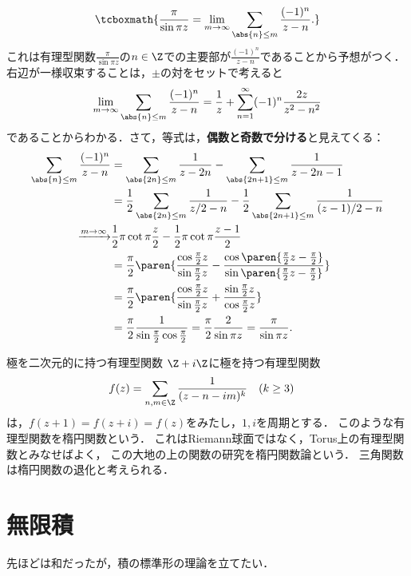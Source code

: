\documentclass[uplatex, dvipdfmx]{jsreport}
\begin{document}
\begin{example}\mbox{}
        \[\tcboxmath{\frac{\pi}{\sin\pi z}=\lim_{m\to\infty}\sum_{\abs{n}\le m}\frac{(-1)^n}{z-n}.}\]
        これは有理型関数$\frac{\pi}{\sin\pi z}$の$n\in\Z$での主要部が$\frac{(-1)^n}{z-n}$であることから予想がつく．
    右辺が一様収束することは，$\pm$の対をセットで考えると
    \[\lim_{m\to\infty}\sum_{\abs{n}\le m}\frac{(-1)^n}{z-n}=\frac{1}{z}+\sum^\infty_{n=1}(-1)^n\frac{2z}{z^2-n^2}\]
    であることからわかる．さて，等式は，\textbf{偶数と奇数で分ける}と見えてくる：
    \begin{align*}
        \sum_{\abs{n}\le m}\frac{(-1)^n}{z-n}&=\sum_{\abs{2n}\le m}\frac{1}{z-2n}-\sum_{\abs{2n+1}\le m}\frac{1}{z-2n-1}\\
        &=\frac{1}{2}\sum_{\abs{2n}\le m}\frac{1}{z/2-n}-\frac{1}{2}\sum_{\abs{2n+1}\le m}\frac{1}{(z-1)/2-n}\\
        \xrightarrow{m\to\infty}&\frac{1}{2}\pi\cot\pi\frac{z}{2}-\frac{1}{2}\pi\cot\pi\frac{z-1}{2}\\
        &=\frac{\pi}{2}\paren{\frac{\cos\frac{\pi}{2}z}{\sin\frac{\pi}{2}z}-\frac{\cos\paren{\frac{\pi}{2}z-\frac{\pi}{2}}}{\sin\paren{\frac{\pi}{2}z-\frac{\pi}{2}}}}\\
        &=\frac{\pi}{2}\paren{\frac{\cos\frac{\pi}{2}z}{\sin\frac{\pi}{2}z}+\frac{\sin\frac{\pi}{2}z}{\cos\frac{\pi}{2}z}}\\
        &=\frac{\pi}{2}\frac{1}{\sin\frac{\pi}{2}\cos\frac{\pi}{2}}=\frac{\pi}{2}\frac{2}{\sin\pi z}=\frac{\pi}{\sin\pi z}.
    \end{align*}
\end{example}

\begin{itembox}[l]{極を二次元的に持つ有理型関数}
    $\Z+i\Z$に極を持つ有理型関数
    \begin{align*}
        f(z)&=\sum_{n,m\in\Z}\frac{1}{(z-n-im)^k}\quad(k\ge 3)
    \end{align*}
    は，$f(z+1)=f(z+i)=f(z)$をみたし，$1,i$を周期とする．
    このような有理型関数を楕円関数という．
    これはRiemann球面ではなく，Torus上の有理型関数とみなせばよく，
    この大地の上の関数の研究を楕円関数論という．
    三角関数は楕円関数の退化と考えられる．
\end{itembox}

\section{無限積}

\begin{tcolorbox}[colframe=ForestGreen, colback=ForestGreen!10!white, breakable ,colbacktitle=ForestGreen!40!white, coltitle=black,fonttitle=\bfseries\sffamily,
    title=整関数の因数分解]
    先ほどは和だったが，積の標準形の理論を立てたい．
\end{tcolorbox}
\end{document}
